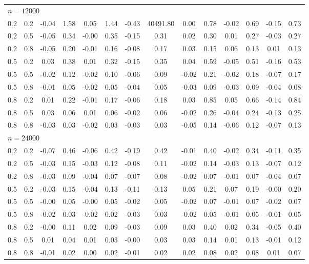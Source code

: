 \begin{table}[t]
\begin{tabular}{cc cc cc cc cc cc cc }
\midrule
\multicolumn{14}{l}{\textit{$n = 12000$}} \\
0.2 & 0.2 & -0.04 & 1.58 & 0.05 & 1.44 & -0.43 & 40491.80 & 0.00 & 0.78 & -0.02 & 0.69 & -0.15 & 0.73 \\
0.2 & 0.5 & -0.05 & 0.34 & -0.00 & 0.35 & -0.15 & 0.31 & 0.02 & 0.30 & 0.01 & 0.27 & -0.03 & 0.27 \\
0.2 & 0.8 & -0.05 & 0.20 & -0.01 & 0.16 & -0.08 & 0.17 & 0.03 & 0.15 & 0.06 & 0.13 & 0.01 & 0.13 \\
0.5 & 0.2 & 0.03 & 0.38 & 0.01 & 0.32 & -0.15 & 0.35 & 0.04 & 0.59 & -0.05 & 0.51 & -0.16 & 0.53 \\
0.5 & 0.5 & -0.02 & 0.12 & -0.02 & 0.10 & -0.06 & 0.09 & -0.02 & 0.21 & -0.02 & 0.18 & -0.07 & 0.17 \\
0.5 & 0.8 & -0.01 & 0.05 & -0.02 & 0.05 & -0.04 & 0.05 & -0.03 & 0.09 & -0.03 & 0.09 & -0.04 & 0.08 \\
0.8 & 0.2 & 0.01 & 0.22 & -0.01 & 0.17 & -0.06 & 0.18 & 0.03 & 0.85 & 0.05 & 0.66 & -0.14 & 0.84 \\
0.8 & 0.5 & 0.03 & 0.06 & 0.01 & 0.06 & -0.02 & 0.06 & -0.02 & 0.26 & -0.04 & 0.24 & -0.13 & 0.25 \\
0.8 & 0.8 & -0.03 & 0.03 & -0.02 & 0.03 & -0.03 & 0.03 & -0.05 & 0.14 & -0.06 & 0.12 & -0.07 & 0.13 \\
\midrule
\multicolumn{14}{l}{\textit{$n = 24000$}} \\
0.2 & 0.2 & -0.07 & 0.46 & -0.06 & 0.42 & -0.19 & 0.42 & -0.01 & 0.40 & -0.02 & 0.34 & -0.11 & 0.35 \\
0.2 & 0.5 & -0.03 & 0.15 & -0.03 & 0.12 & -0.08 & 0.11 & -0.02 & 0.14 & -0.03 & 0.13 & -0.07 & 0.12 \\
0.2 & 0.8 & -0.03 & 0.09 & -0.04 & 0.07 & -0.07 & 0.08 & -0.02 & 0.07 & -0.01 & 0.07 & -0.04 & 0.07 \\
0.5 & 0.2 & -0.03 & 0.15 & -0.04 & 0.13 & -0.11 & 0.13 & 0.05 & 0.21 & 0.07 & 0.19 & -0.00 & 0.20 \\
0.5 & 0.5 & -0.00 & 0.05 & -0.00 & 0.05 & -0.02 & 0.05 & -0.02 & 0.07 & -0.01 & 0.07 & -0.02 & 0.07 \\
0.5 & 0.8 & -0.02 & 0.03 & -0.02 & 0.02 & -0.03 & 0.03 & -0.02 & 0.05 & -0.01 & 0.05 & -0.01 & 0.05 \\
0.8 & 0.2 & -0.00 & 0.11 & 0.02 & 0.09 & -0.03 & 0.09 & 0.03 & 0.40 & 0.02 & 0.34 & -0.05 & 0.40 \\
0.8 & 0.5 & 0.01 & 0.04 & 0.01 & 0.03 & -0.00 & 0.03 & 0.03 & 0.14 & 0.01 & 0.13 & -0.01 & 0.12 \\
0.8 & 0.8 & -0.01 & 0.02 & 0.00 & 0.02 & -0.01 & 0.02 & 0.02 & 0.08 & 0.02 & 0.08 & 0.01 & 0.07 \\
\bottomrule
\end{tabular}
\end{table}

